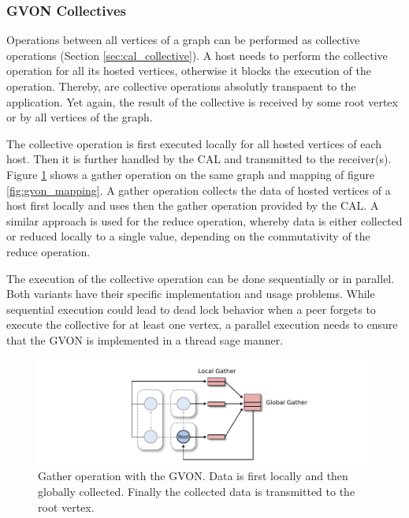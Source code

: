 \subsubsection*{GVON Collectives}
Operations between all vertices of a graph can be performed as
collective operations (Section \ref{sec:cal_collective}). A host needs
to perform the collective operation for all its hosted vertices,
otherwise it blocks the execution of the operation.  Thereby, are
collective operations absolutly transpaent to the application. Yet
again, the result of the collective is received by some root vertex or
by all vertices of the graph.

The collective operation is first executed locally for all hosted
vertices of each host. Then it is further handled by the CAL and
transmitted to the receiver(s). Figure \ref{fig:gvon_collective} shows
a gather operation on the same graph and mapping of figure
\ref{fig:gvon_mapping}. A gather operation collects the data of hosted
vertices of a host first locally and uses then the gather operation
provided by the CAL. A similar approach is used for the reduce
operation, whereby data is either collected or reduced locally to a
single value, depending on the commutativity of the reduce
operation. 

The execution of the collective operation can be done sequentially or in
parallel. Both variants have their specific implementation and usage
problems. While sequential execution could lead to dead lock behavior
when a peer forgets to execute the collective for at least one vertex,
a parallel execution needs to ensure that the GVON is implemented in
a thread sage manner.

\begin{figure}[H]
  \centering \includegraphics[width=\textwidth]{graphics/30_gvon_collective}
  \caption{Gather operation with the GVON. Data is first locally 
    and then globally collected. Finally the collected data
    is transmitted to the root vertex.}
  \label{fig:gvon_collective}
\end{figure}


